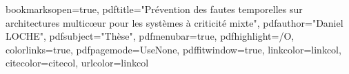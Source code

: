 \graphicspath{{.}{schemas/}{graphiques/}{tables/}}



\usepackage{color}

\hypersetup
{
bookmarksopen=true,
pdftitle="Prévention des fautes temporelles sur architectures multicœur pour les systèmes à criticité mixte",
pdfauthor="Daniel LOCHE", %
pdfsubject="Thèse", %
pdfmenubar=true, %
pdfhighlight=/O, %
colorlinks=true, %
pdfpagemode=UseNone, %
pdffitwindow=true, %
linkcolor=linkcol, %
citecolor=citecol, %
urlcolor=linkcol %
}


\setcounter{secnumdepth}{3}
\setcounter{tocdepth}{2}


\newcommand{\pd}[2]{\frac{\partial #1}{\partial #2}}
\def\abs{\operatorname{abs}}
\def\argmax{\operatornamewithlimits{arg\,max}}
\def\argmin{\operatornamewithlimits{arg\,min}}
\def\diag{\operatorname{Diag}}
\newcommand{\eqRef}[1]{(\ref{#1})}
\newcommand{\nline}{\smallbreak\noindent}

\usepackage{rotating}                    %

